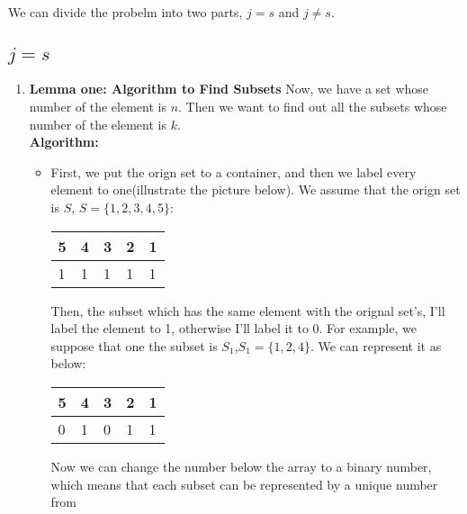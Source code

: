 
We can divide the probelm into two parts, $j=s$ and $j \neq s$.
\subsection{$j=s$}
    \begin{enumerate}
        \item \textbf{Lemma one: Algorithm to Find Subsets}
        Now, we have a set whose number of the element is $n$. Then we want to find out all the subsets whose 
        number of the element is $k$.\\
        \textbf{Algorithm: \\}
        \begin{itemize}
            \item First, we put the orign set to a container, and then we label every element to one(illustrate the picture below). 
            We assume that the orign set is $S$, $S=\{1,2,3,4,5\}$:\\
            \begin{table}[H]
            \centering
            \begin{tabular}{lllll}
            \hline
            \multicolumn{1}{|l|}{5} & \multicolumn{1}{l|}{4} & \multicolumn{1}{l|}{3} & \multicolumn{1}{l|}{2} & \multicolumn{1}{l|}{1} \\ \hline
            1                       & 1                      & 1                      & 1                      & 1                     
            \end{tabular}
            \end{table}
            Then, the subset which has the same element with the orignal set's, I'll label the element to 1, otherwise I'll label it to 0. For 
            example, we suppose that one the subset is $S_1$,$S_1=\{1,2,4\}$. We can represent it as below:\\
            \begin{table}[H]
            \centering
            \begin{tabular}{lllll}
            \hline
            \multicolumn{1}{|l|}{5} & \multicolumn{1}{l|}{4} & \multicolumn{1}{l|}{3} & \multicolumn{1}{l|}{2} & \multicolumn{1}{l|}{1} \\ \hline
            0                       & 1                      & 0                      & 1                      & 1                     
            \end{tabular}
            \end{table}
            Now we can change the number below the array to a binary number, which means that each subset can be represented by a unique number from 

\end{itemize}
\end{enumerate}
